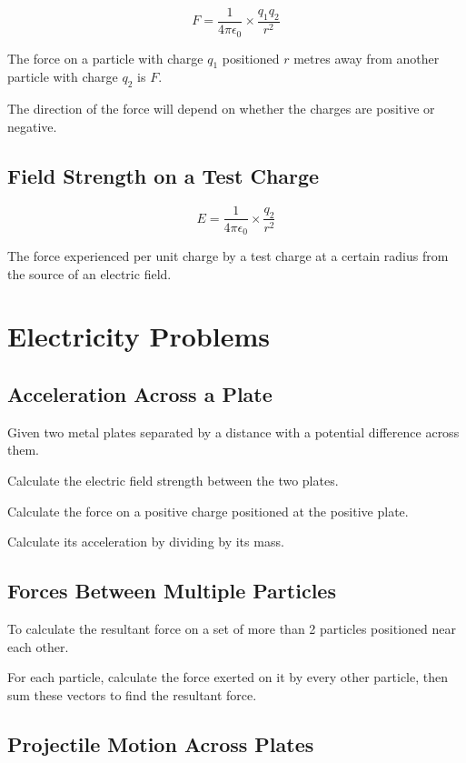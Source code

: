 \documentclass[a4paper,11pt]{article}
\begin{document}
$$
F = \frac{1}{4 \pi \epsilon_0} \times \frac{q_1 q_2}{r^2}
$$

The force on a particle with charge $q_1$ positioned $r$ metres away from
another particle with charge $q_2$ is $F$.

The direction of the force will depend on whether the charges are positive or
negative.


\subsection{Field Strength on a Test Charge}

$$
E = \frac{1}{4\pi \epsilon_0} \times \frac{q_2}{r^2}
$$

The force experienced per unit charge by a test charge at a certain radius from
the source of an electric field.




\section{Electricity Problems}

\subsection{Acceleration Across a Plate}

Given two metal plates separated by a distance with a potential difference
across them.

Calculate the electric field strength between the two plates.

Calculate the force on a positive charge positioned at the positive plate.

Calculate its acceleration by dividing by its mass.


\subsection{Forces Between Multiple Particles}

To calculate the resultant force on a set of more than 2 particles positioned
near each other.

For each particle, calculate the force exerted on it by every other particle,
then sum these vectors to find the resultant force.


\subsection{Projectile Motion Across Plates}
\end{document}

